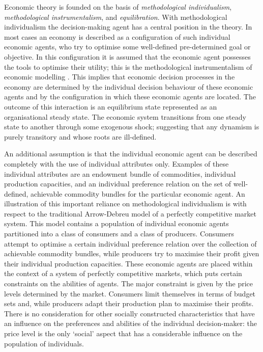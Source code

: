 Economic theory is founded on the basis of \emph{methodological individualism}, \emph{methodological instrumentalism}, and \emph{equilibration}. With methodological individualism the decision-making agent has a central position in the theory. In most cases an economy is described as a configuration of such individual economic agents, who try to optimise some well-defined pre-determined goal or objective. In this configuration it is assumed that the economic agent possesses the tools to optimise their utility; this is the methodological instrumentalism of economic modelling \citep{Arnsperger2006}. This implies that economic decision processes in the economy are determined by the individual decision behaviour of these economic agents and by the configuration in which these economic agents are located. The outcome of this interaction is an equilibrium state represented as an organisational steady state. The economic system transitions from one steady state to another through some exogenous shock; suggesting that any dynamism is purely transitory and whose roots are ill-defined.

An additional assumption is that the individual economic agent can be described completely with the use of individual attributes only. Examples of these individual attributes are an endowment bundle of commodities, individual production capacities, and an individual preference relation on the set of well-defined, achievable commodity bundles for the particular economic agent. An illustration of this important reliance on methodological individualism is with respect to the traditional Arrow-Debreu model of a perfectly competitive market system. This model contains a population of individual economic agents partitioned into a class of consumers and a class of producers. Consumers attempt to optimise a certain individual preference relation over the collection of achievable commodity bundles, while producers try to maximise their profit given their individual production capacities. These economic agents are placed within the context of a system of perfectly competitive markets, which puts certain constraints on the abilities of agents. The major constraint is given by the price levels determined by the market. Consumers limit themselves in terms of budget sets and, while producers adapt their production plan to maximise their profits. There is no consideration for other socially constructed characteristics that have an influence on the preferences and abilities of the individual decision-maker: the price level is the only `social' aspect that has a considerable influence on the population of individuals.

